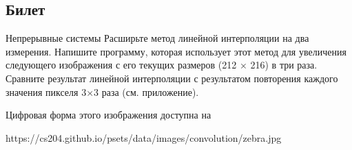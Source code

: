 \documentclass{exam}
\begin{document}
\newpage
\begin{questions}
\section{Билет}
	\question 
Непрерывные системы 
	\question 
Расширьте метод линейной интерполяции на два измерения.  
Напишите программу, которая использует этот метод для 
увеличения следующего изображения с его текущих размеров 
(212 × 216) в три раза.  
Сравните результат линейной интерполяции с результатом 
повторения каждого значения пикселя 3×3 раза (см. приложение).


Цифровая форма этого изображения доступна 
на 

	https://cs204.github.io/psets/data/images/convolution/zebra.jpg
\end{questions}
\vspace{15pt}
\end{document}
